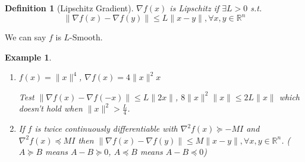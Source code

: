 \documentclass[11pt,a4paper]{article}
\newtheorem{definition}{Definition}
\newtheorem{example}{Example}
\begin{document}
\begin{definition}[Lipschitz Gradient]
    $\nabla f(x)$ is Lipschitz if $\exists L>0$ s.t. $$\|\nabla f(x)-\nabla f(y)\|\leq L\|x-y\|,\forall x,y\in \mathbb{R}^n$$
\end{definition}
We can say $f$ is $L$-Smooth.

\begin{example}
    \quad

\begin{enumerate}
    \item $f(x)=\|x\|^4$, $\nabla f(x)=4\|x\|^2x$
    
    Test $\|\nabla f(x)-\nabla f(-x)\|\leq L\|2x\|$, $8\|x\|^2\|x\|\leq 2L\|x\|$ which doesn't hold when $\|x\|^2>\frac{L}{4}$.
    \item If $f$ is twice continuously differentiable with $\nabla^2 f(x)\succeq -MI$ and $\nabla^2 f(x)\preceq  MI$ then $\|\nabla f(x)-\nabla f(y)\|\leq M\|x-y\|,\forall x,y\in \mathbb{R}^n$. ($A\succeq B$ means $A-B\succeq 0$, $A\preceq B$ means $A-B\preceq 0$)
\end{enumerate}
\end{example}
\end{document}

